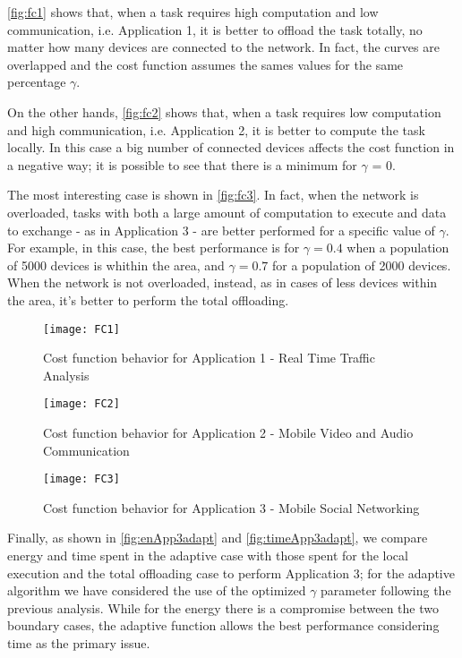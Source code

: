 \documentclass[twoside,openright]{report}
\begin{document}
\autoref{fig:fc1} shows that, when a task requires high computation and low communication, i.e. Application 1, it is better to offload the task totally, no matter how many devices are connected to the network. 
In fact, the curves are overlapped and the cost function assumes the sames values for the same percentage $\gamma$.

On the other hands, \autoref{fig:fc2} shows that, when a task requires low computation and high communication, i.e. Application 2, it is better to compute the task locally. In this case a big number of connected devices affects the cost function in a negative way; it is possible to see that there is a minimum for $\gamma$ = 0.


The most interesting case is shown in \autoref{fig:fc3}.  In fact, when the network is overloaded, tasks with both a large amount of computation to execute and data to exchange - as in Application 3 - are better performed for a specific value of $\gamma$. For example, in this case, the best performance is for $\gamma = 0.4$ when a population of 5000 devices is whithin the area, and $\gamma= 0.7$ for a population of 2000 devices. When the network is not overloaded, instead, as in cases of less devices within the area, it's better to perform the total offloading. 

\begin{figure}[tbp]
\centering
\texttt{[image: FC1]}
\caption{Cost function behavior for Application 1 - Real Time Traffic Analysis}
\label{fig:fc1}
\end{figure}

\begin{figure}[tbp]
\centering
\texttt{[image: FC2]}
\caption{Cost function behavior for Application 2 - Mobile Video and Audio Communication}
\label{fig:fc2}
\end{figure}

\begin{figure}[tbp]
\centering
\texttt{[image: FC3]}
\caption{Cost function behavior for Application 3 - Mobile Social Networking}
\label{fig:fc3}
\end{figure}

Finally, as shown in \autoref{fig:enApp3adapt} and \autoref{fig:timeApp3adapt},  we compare energy and time spent in the adaptive case with those spent for the local execution and the total offloading case to perform Application 3; for the adaptive algorithm we have considered the use of the optimized $\gamma$ parameter following the previous analysis. 
While for the energy there is a compromise between the two boundary cases, the adaptive function allows the best performance considering time as the primary issue.
\end{document}
